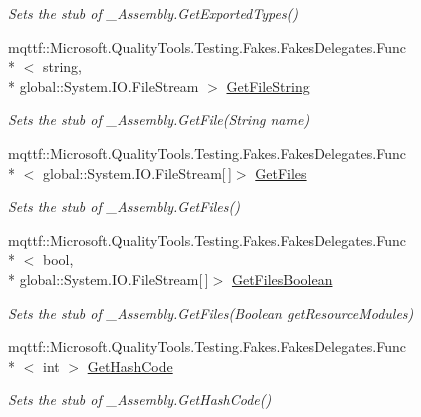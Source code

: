 \begin{DoxyCompactItemize}
\begin{DoxyCompactList}\small\item\em Sets the stub of \-\_\-\-Assembly.\-Get\-Exported\-Types()\end{DoxyCompactList}\item 
mqttf\-::\-Microsoft.\-Quality\-Tools.\-Testing.\-Fakes.\-Fakes\-Delegates.\-Func\\*
$<$ string, \\*
global\-::\-System.\-I\-O.\-File\-Stream $>$ \hyperlink{class_system_1_1_runtime_1_1_interop_services_1_1_fakes_1_1_stub___assembly_a225f29a4f42a848b5331d6b6661bcbef}{Get\-File\-String}
\begin{DoxyCompactList}\small\item\em Sets the stub of \-\_\-\-Assembly.\-Get\-File(\-String name)\end{DoxyCompactList}\item 
mqttf\-::\-Microsoft.\-Quality\-Tools.\-Testing.\-Fakes.\-Fakes\-Delegates.\-Func\\*
$<$ global\-::\-System.\-I\-O.\-File\-Stream\mbox{[}$\,$\mbox{]}$>$ \hyperlink{class_system_1_1_runtime_1_1_interop_services_1_1_fakes_1_1_stub___assembly_a71b2b09264df28badd9db891c8d124be}{Get\-Files}
\begin{DoxyCompactList}\small\item\em Sets the stub of \-\_\-\-Assembly.\-Get\-Files()\end{DoxyCompactList}\item 
mqttf\-::\-Microsoft.\-Quality\-Tools.\-Testing.\-Fakes.\-Fakes\-Delegates.\-Func\\*
$<$ bool, \\*
global\-::\-System.\-I\-O.\-File\-Stream\mbox{[}$\,$\mbox{]}$>$ \hyperlink{class_system_1_1_runtime_1_1_interop_services_1_1_fakes_1_1_stub___assembly_a839faeab64465e7b99483406bcec73a4}{Get\-Files\-Boolean}
\begin{DoxyCompactList}\small\item\em Sets the stub of \-\_\-\-Assembly.\-Get\-Files(\-Boolean get\-Resource\-Modules)\end{DoxyCompactList}\item 
mqttf\-::\-Microsoft.\-Quality\-Tools.\-Testing.\-Fakes.\-Fakes\-Delegates.\-Func\\*
$<$ int $>$ \hyperlink{class_system_1_1_runtime_1_1_interop_services_1_1_fakes_1_1_stub___assembly_a24a8ec84805236584d60ce11dfde2498}{Get\-Hash\-Code}
\begin{DoxyCompactList}\small\item\em Sets the stub of \-\_\-\-Assembly.\-Get\-Hash\-Code()\end{DoxyCompactList}\item 

\end{DoxyCompactItemize}

